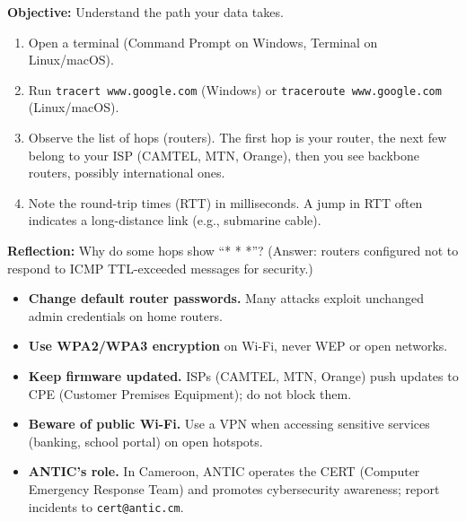 \documentclass[11pt]{article}
\newcommand{\cle}[1]{{\popxbold\color{popdark}#1}}
\begin{document}
\begin{experience}
\textbf{Objective:} Understand the path your data takes.
\begin{enumerate}
\item Open a terminal (Command Prompt on Windows, Terminal on Linux/macOS).
\item Run \texttt{tracert www.google.com} (Windows) or \texttt{traceroute www.google.com} (Linux/macOS).
\item Observe the list of hops (routers). The first hop is your router, the next few belong to your ISP (CAMTEL, MTN, Orange), then you see backbone routers, possibly international ones.
\item Note the round-trip times (RTT) in milliseconds. A jump in RTT often indicates a long-distance link (e.g., submarine cable).
\end{enumerate}
\textbf{Reflection:} Why do some hops show ``* * *''? (Answer: routers configured not to respond to ICMP TTL-exceeded messages for security.)
\end{experience}

\begin{attention}
\begin{itemize}
\item \textbf{Change default router passwords.} Many attacks exploit unchanged admin credentials on home routers.
\item \textbf{Use WPA2/WPA3 encryption} on Wi-Fi, never WEP or open networks.
\item \textbf{Keep firmware updated.} ISPs (CAMTEL, MTN, Orange) push updates to CPE (Customer Premises Equipment); do not block them.
\item \textbf{Beware of public Wi-Fi.} Use a VPN when accessing sensitive services (banking, school portal) on open hotspots.
\item \textbf{ANTIC's role.} In Cameroon, ANTIC operates the \cle{CERT} (Computer Emergency Response Team) and promotes cybersecurity awareness; report incidents to \texttt{cert@antic.cm}.
\end{itemize}
\end{attention}
\end{document}
